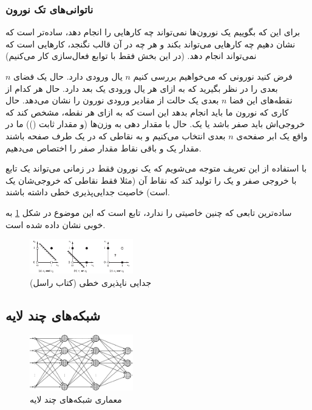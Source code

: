 \documentclass[11pt,a4paper,twocolumn]{article}
\begin{document}
\subsubsection{ناتوانی‌های تک نورون}
برای این که بگوییم یک نورون‌ها نمی‌تواند چه کار‌هایی را انجام دهد، ساده‌تر است که نشان دهیم چه کار‌هایی می‌تواند بکند و هر چه در آن قالب نگنجد، کار‌هایی است که نمی‌تواند انجام دهد. (در این بخش فقط با توابع فعال‌سازی  کار می‌کنیم)

فرض کنید نورونی که می‌خواهیم بررسی کنیم $n$ یال ورودی دارد. حال یک فضای $n$ بعدی را در نظر بگیرید که به ازای هر یال ورودی یک بعد دارد. حال هر کدام از نقطه‌های این فضا $n$ بعدی یک حالت از مقادیر ورودی نورون را نشان می‌دهد. حال  کاری که نورون ما باید انجام بدهد این است که به ازای هر نقطه،‌ مشخص کند که خروجی‌اش باید صفر باشد یا یک. حال با مقدار دهی به وزن‌ها (و مقدار ثابت ()) ما در واقع یک ابر صفحه‌ی $n$ بعدی انتخاب می‌کنیم و به نقاطی که در یک طرف صفحه باشند مقدار یک و باقی نقاط مقدار صفر را اختصاص می‌دهیم.\cite{ml-hinton}

با استفاده از این تعریف متوجه می‌شویم که یک نورون فقط در زمانی می‌تواند یک تابع با خروجی صفر و یک را تولید کند که نقاط آن (مثلا فقط نقاطی که خروجی‌شان یک است) خاصیت
جدایی‌پذیری خطی
داشته باشند.

ساده‌ترین تابعی که چنین خاصیتی را ندارد، تابع  است که این موضوع در شکل
\ref{fig:linear_separability}
به خوبی نشان داده شده است.
\begin{figure}
  \centering
    \includegraphics[width=0.4\textwidth]{linear_separability.png}
  \caption{جدایی ناپذیری خطی  (کتاب راسل\cite[ص-۷۳۰]{russell})}
  \label{fig:linear_separability}
\end{figure}

\subsection{شبکه‌های چند لایه}
\label{sec:multilayer}
\begin{figure}
  \centering
    \includegraphics[width=0.4\textwidth]{multilayer.png}
  \caption{معماری شبکه‌های چند لایه \cite{haykin}}
  \label{fig:multilayer}
\end{figure}
\end{document}
